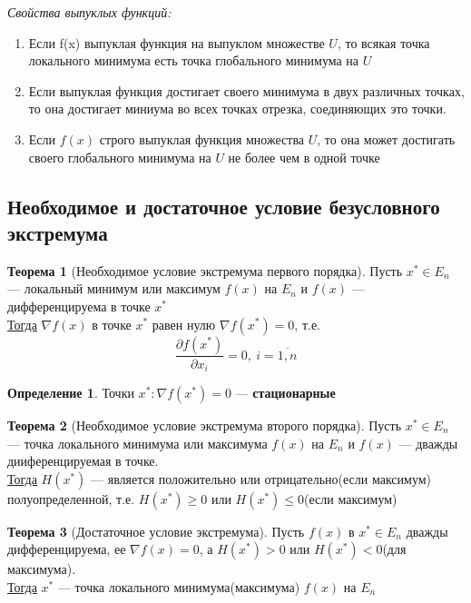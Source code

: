 \documentclass[oneside]{book}
\theoremstyle{plain}
\theoremstyle{remark}
\theoremstyle{definition}
\newtheorem{theorem}{Теорема}[section]
\newtheorem*{definition}{Определение}
\begin{document}
\emph{Свойства выпуклых функций:}
\begin{enumerate}
\item Если f(x) выпуклая функция на выпуклом множестве \(U\), то всякая точка локального минимума есть точка глобального минимума на \(U\)
\item Если выпуклая функция достигает своего минимума в двух различных точках, то она достигает миниума во всех точках отрезка, соединяющих это точки.
\item Если \(f(x)\) строго выпуклая функция множества \(U\), то она может достигать своего глобального минимума на \(U\) не более чем в одной точке
\end{enumerate}
\subsection{Необходимое и достаточное условие безусловного экстремума}
\label{sec:org37fc674}
\begin{theorem}[Необходимое условие экстремума первого порядка]
Пусть \(x^* \in E_n\) --- локальный минимум или максимум \(f(x)\) на \(E_n\) и \(f(x)\) --- дифференцируема в точке \(x^*\) \\
\uline{Тогда} \(\nabla f(x)\) в точке \(x^*\) равен нулю \(\nabla f(x^*) = 0\), т.е.
\[ \frac{\partial f(x^*)}{\partial x_i} = 0,\ i = \overline{1, n} \]
\end{theorem}
\begin{definition}
Точки \(x^*: \nabla f(x^*) = 0\) --- \textbf{стационарные}
\end{definition}
\begin{theorem}[Необходимое условие экстремума второго порядка]
Пусть \(x^* \in E_n\) --- точка локального минимума или максимума \(f(x)\) на \(E_n\) и \(f(x)\) --- дважды дииференцируемая в точке. \\
\uline{Тогда} \(H(x^*)\) --- является положительно или отрицательно(если максимум) полуопределенной, т.е. \(H(x^*) \ge 0\) или \(H(x^*) \le 0\)(если максимум)
\end{theorem}
\begin{theorem}[Достаточное условие экстремума]
Пусть \(f(x)\) в \(x^* \in E_n\) дважды дифференцируема, ее \(\nabla f(x) = 0\), а \(H(x^*) > 0\) или \(H(x^*) < 0\)(для максимума). \\
\uline{Тогда} \(x^*\) --- точка локального минимума(максимума) \(f(x)\) на \(E_n\)
\end{theorem}
\end{document}
